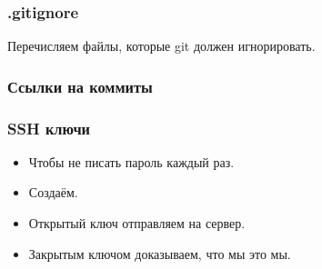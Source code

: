 \documentclass[pdf,russian]{beamer}
\begin{document}
\begin{frame}
    \frametitle{.gitignore}
    Перечисляем файлы, которые git должен игнорировать.
\end{frame}

\begin{frame}
    \frametitle{Ссылки на коммиты}
\end{frame}

\begin{frame}
    \frametitle{SSH ключи}
    \begin{itemize}
        \item Чтобы не писать пароль каждый раз.
        \pause
        \item Создаём.
        \pause
        \item Открытый ключ отправляем на сервер.
        \pause
        \item Закрытым ключом доказываем, что мы это мы.
    \end{itemize}
\end{frame}
\end{document}
